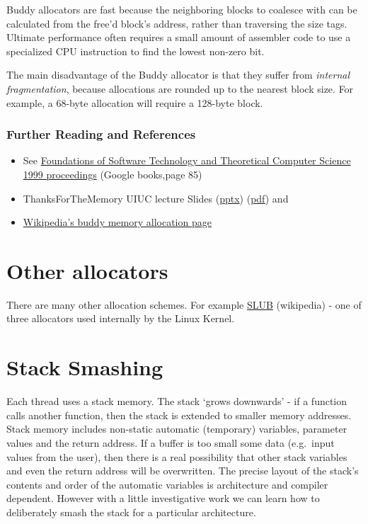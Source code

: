 Buddy allocators are fast because the neighboring blocks to coalesce
with can be calculated from the free'd block's address, rather than
traversing the size tags. Ultimate performance often requires a small
amount of assembler code to use a specialized CPU instruction to find
the lowest non-zero bit.

The main disadvantage of the Buddy allocator is that they suffer from
\emph{internal fragmentation}, because allocations are rounded up to the
nearest block size. For example, a 68-byte allocation will require a
128-byte block.

\subsubsection{Further Reading and
References}\label{further-reading-and-references}

\begin{itemize}
\tightlist
\item
  See
  \href{http://books.google.com/books?id=0uHME7EfjQEC\&lpg=PP1\&pg=PA85\#v=onepage\&q\&f=false}{Foundations
  of Software Technology and Theoretical Computer Science 1999
  proceedings} (Google books,page 85)
\item
  ThanksForTheMemory UIUC lecture Slides
  (\href{https://subversion.ews.illinois.edu/svn/sp17-cs241/_shared/wikifiles/CS241-05-ThanksForTheMemorySlides.pptx}{pptx})
  (\href{https://subversion.ews.illinois.edu/svn/sp17-cs241/_shared/wikifiles/CS241-05-ThanksForTheMemorySlides.pdf}{pdf})
  and
\item
  \href{http://en.wikipedia.org/wiki/Buddy_memory_allocation}{Wikipedia's
  buddy memory allocation page}
\end{itemize}

\section{Other allocators}\label{other-allocators}

There are many other allocation schemes. For example
\href{http://en.wikipedia.org/wiki/SLUB_\%28software\%29}{SLUB}
(wikipedia) - one of three allocators used internally by the Linux
Kernel.

\section{Stack Smashing}\label{stack-smashing}

Each thread uses a stack memory. The stack `grows downwards' - if a
function calls another function, then the stack is extended to smaller
memory addresses. Stack memory includes non-static automatic (temporary)
variables, parameter values and the return address. If a buffer is too
small some data (e.g.~input values from the user), then there is a real
possibility that other stack variables and even the return address will
be overwritten. The precise layout of the stack's contents and order of
the automatic variables is architecture and compiler dependent. However
with a little investigative work we can learn how to deliberately smash
the stack for a particular architecture.

